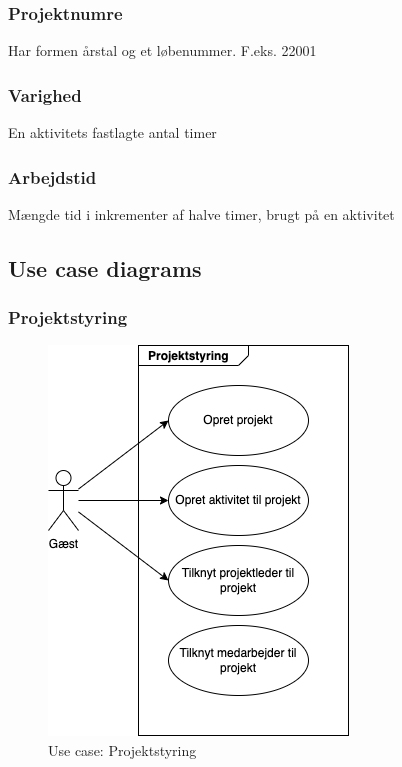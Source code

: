 \subsubsection{Projektnumre} Har formen årstal og et løbenummer. F.eks. 22001
\subsubsection{Varighed} En aktivitets fastlagte antal timer
\subsubsection{Arbejdstid} Mængde tid i inkrementer af halve timer, brugt på en aktivitet


\subsection{Use case diagrams}

\subsubsection{Projektstyring} 
\begin{figure}[ht]
    \centering
    \includegraphics{diagrams/guest_project}
    \caption{Use case: Projektstyring}
    \label{fig:my_image}
\end{figure}

